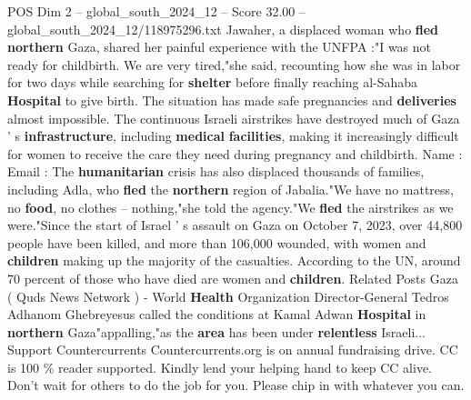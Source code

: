 \begin{textsample}{POS Dim 2 – global\_south\_2024\_12 – Score 32.00 – global\_south\_2024\_12/118975296.txt}
Jawaher, a displaced woman who \textbf{fled} \textbf{northern} Gaza, shared her painful experience with the UNFPA :"I was not ready for childbirth.
We are very tired,"she said, recounting how she was in labor for two days while searching for \textbf{shelter} before finally reaching al-Sahaba \textbf{Hospital} to give birth.
The situation has made safe pregnancies and \textbf{deliveries} almost impossible.
The continuous Israeli airstrikes have destroyed much of Gaza ' s \textbf{infrastructure}, including \textbf{medical} \textbf{facilities}, making it increasingly difficult for women to receive the care they need during pregnancy and childbirth.
Name : Email : The \textbf{humanitarian} crisis has also displaced thousands of families, including Adla, who \textbf{fled} the \textbf{northern} region of Jabalia."We have no mattress, no \textbf{food}, no clothes -- nothing,"she told the agency."We \textbf{fled} the airstrikes as we were."Since the start of Israel ' s assault on Gaza on October 7, 2023, over 44,800 people have been killed, and more than 106,000 wounded, with women and \textbf{children} making up the majority of the casualties.
According to the UN, around 70 percent of those who have died are women and \textbf{children}.
Related Posts Gaza ( Quds News Network ) - World \textbf{Health} Organization Director-General Tedros Adhanom Ghebreyesus called the conditions at Kamal Adwan \textbf{Hospital} in \textbf{northern} Gaza"appalling,"as the \textbf{area} has been under \textbf{relentless} Israeli...
Support Countercurrents Countercurrents.org is on annual fundraising drive.
CC is 100 \% reader supported.
Kindly lend your helping hand to keep CC alive.
Don't wait for others to do the job for you.
Please chip in with whatever you can.

\end{textsample}
